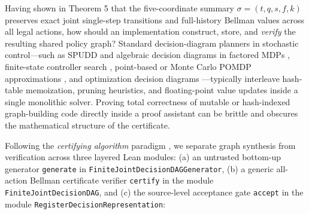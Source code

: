\documentclass[11pt,a4paper]{article}
\begin{document}
Having shown in Theorem 5 that the five-coordinate summary
\(\sigma = (t, q, s, f, k)\) preserves exact joint single-step
transitions and full-history Bellman values across all legal actions,
how should an implementation construct, store, and \emph{verify} the
resulting shared policy graph? Standard decision-diagram planners in
stochastic control---such as SPUDD and algebraic decision diagrams in
factored MDPs \citep{bryant1986, bahar1997, hoey1999, boutilier2000},
finite-state controller search
\citep{littman1995, hansen1998, meuleau1999, poupartBoutilier2003},
point-based or Monte Carlo POMDP approximations
\citep{pineau2003, spaanVlassis2005, silverVeness2010}, and optimization
decision diagrams \citep{bergman2016}---typically interleave hash-table
memoization, pruning heuristics, and floating-point value updates inside
a single monolithic solver. Proving total correctness of mutable or
hash-indexed graph-building code directly inside a proof assistant can
be brittle and obscures the mathematical structure of the certificate.

Following the \emph{certifying algorithm} paradigm
\citep{blumKannan1995, mcconnell2011}, we separate graph synthesis from
verification across three layered Lean modules: (a) an untrusted
bottom-up generator \texttt{generate} in
\texttt{FiniteJointDecisionDAGGenerator}, (b) a generic all-action
Bellman certificate verifier \texttt{certify} in the module
\texttt{FiniteJointDecisionDAG}, and (c) the source-level acceptance
gate \texttt{accept} in the module
\texttt{RegisterDecisionRepresentation}:
\end{document}
